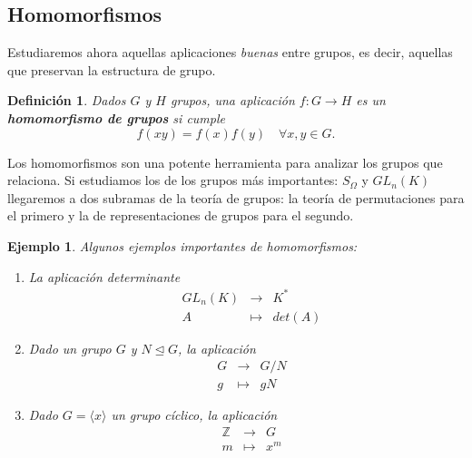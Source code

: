 \documentclass[12pt]{article}
\newtheorem{definition}[theorem]{Definición}
\newtheorem{example}{Ejemplo}[theorem]
\begin{document}
\subsection{Homomorfismos}

Estudiaremos ahora aquellas aplicaciones \textit{buenas} entre grupos, es decir, aquellas que preservan la estructura de grupo.

\begin{definition}Dados $G$ y $H$ grupos, una aplicación $f \colon G \longrightarrow H$ es un \textbf{homomorfismo de grupos} si cumple $$f(xy) = f(x)f(y) \quad \forall x,y \in G.$$
\end{definition}

Los homomorfismos son una potente herramienta para analizar los grupos que relaciona. Si estudiamos los de los grupos más importantes: $S_{\Omega}$ y $GL_n(K)$ llegaremos a dos subramas de la teoría de grupos: la teoría de permutaciones para el primero y la de representaciones de grupos para el segundo.

\begin{example}\label{eq:ejsHoms} Algunos ejemplos importantes de homomorfismos:
\begin{enumerate}
\item La aplicación determinante $$\begin{array}{rccl}
&GL_n(K)&\longrightarrow &K^* \\
&A& \longmapsto &det(A)
\end{array}
$$
\item Dado un grupo $G$ y $N \unlhd G$, la aplicación $$\begin{array}{rccl}
&G&\longrightarrow &G/N \\
&g& \longmapsto &gN
\end{array}
$$
\item Dado $G = \langle x \rangle$ un grupo cíclico, la aplicación $$\begin{array}{rccl}
&\mathbb{Z}&\longrightarrow &G \\
&m& \longmapsto &x^m
\end{array}
$$
\end{enumerate}
\end{example}
\end{document}
